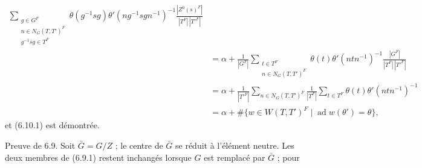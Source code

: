 \documentclass[9pt,twoside]{extarticle}
\begin{document}
{\[\begin{aligned}
\sum_{\substack{g\in G^F\\n\in N_G(T,T')^F\\g^{-1}sg\in T^F}}
\theta(g^{-1}sg)\theta'(ng^{-1}sgn^{-1})^{-1}
\frac{|Z^0(s)^F|}{|T^F|\,|T'^F|}\\
&=\alpha+\frac1{|G^F|}\sum_{\substack{t\in T^F\\n\in N_G(T,T')^F}}
\theta(t)\theta'(ntn^{-1})^{-1}
\frac{|G^F|}{|T^F|\,|T'^F|}\\
&=\alpha+\frac1{|T'^F|}\sum_{n\in N_G(T,T')^F}\frac1{|T^F|}
\sum_{t\in T^F}\theta(t)\theta'(ntn^{-1})^{-1}\\
&=\alpha+\#\{w\in W(T,T')^F\mid \operatorname{ad}w(\theta')=\theta\},
\end{aligned}
\] et (6.10.1) est démontrée.\par

Preuve de 6.9. Soit \(\bar G=G/Z\) ; le centre de \(\bar G\) se réduit à l'élément neutre. Les deux membres de (6.9.1) restent inchangés lorsque \(G\) est remplacé par \(\bar G\) ; pour\par
}
\end{document}
